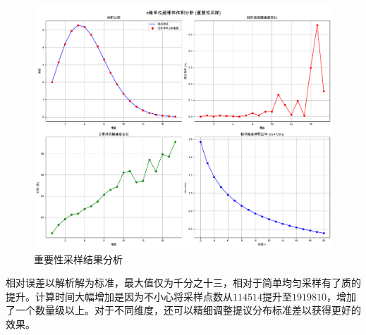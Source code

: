 \begin{figure}[H]
    \centering
    \includegraphics[width=1.0\textwidth]{Problem_1/figs/important.png}
    \caption{重要性采样结果分析}
\end{figure}
相对误差以解析解为标准，最大值仅为千分之十三，相对于简单均匀采样有了质的提升。计算时间大幅增加是因为不小心将采样点数从$114514$提升至$1919810$，增加了一个数量级以上。对于不同维度，还可以精细调整提议分布标准差以获得更好的效果。